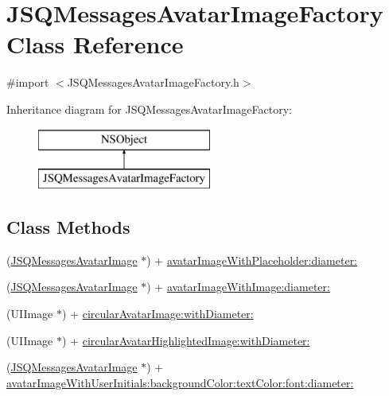 \hypertarget{interface_j_s_q_messages_avatar_image_factory}{}\section{J\+S\+Q\+Messages\+Avatar\+Image\+Factory Class Reference}
\label{interface_j_s_q_messages_avatar_image_factory}


{\ttfamily \#import $<$J\+S\+Q\+Messages\+Avatar\+Image\+Factory.\+h$>$}

Inheritance diagram for J\+S\+Q\+Messages\+Avatar\+Image\+Factory\+:\begin{figure}[H]
\begin{center}
\leavevmode
\includegraphics[height=2.000000cm]{interface_j_s_q_messages_avatar_image_factory}
\end{center}
\end{figure}
\subsection*{Class Methods}
\begin{DoxyCompactItemize}
\item 
(\hyperlink{interface_j_s_q_messages_avatar_image}{J\+S\+Q\+Messages\+Avatar\+Image} $\ast$) + \hyperlink{interface_j_s_q_messages_avatar_image_factory_ab028fd55833ba3829a88ef81aa28c339}{avatar\+Image\+With\+Placeholder\+:diameter\+:}
\item 
(\hyperlink{interface_j_s_q_messages_avatar_image}{J\+S\+Q\+Messages\+Avatar\+Image} $\ast$) + \hyperlink{interface_j_s_q_messages_avatar_image_factory_a75cc88c704c0cbc5fb325bd9aee28b19}{avatar\+Image\+With\+Image\+:diameter\+:}
\item 
(U\+I\+Image $\ast$) + \hyperlink{interface_j_s_q_messages_avatar_image_factory_a9f1ed0814bc65980daeb6b3f2fc9483d}{circular\+Avatar\+Image\+:with\+Diameter\+:}
\item 
(U\+I\+Image $\ast$) + \hyperlink{interface_j_s_q_messages_avatar_image_factory_a69d65d43733e6578372c306ca99e6b6d}{circular\+Avatar\+Highlighted\+Image\+:with\+Diameter\+:}
\item 
(\hyperlink{interface_j_s_q_messages_avatar_image}{J\+S\+Q\+Messages\+Avatar\+Image} $\ast$) + \hyperlink{interface_j_s_q_messages_avatar_image_factory_af0e3cdb04c0c17e95fc7d890526586f4}{avatar\+Image\+With\+User\+Initials\+:background\+Color\+:text\+Color\+:font\+:diameter\+:}
\end{DoxyCompactItemize}


